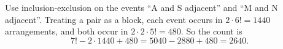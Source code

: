 Use inclusion-exclusion on the events ``A and S adjacent'' and ``M and N adjacent''. Treating a pair as a block, each event occurs in $2\cdot6!=1440$ arrangements, and both occur in $2\cdot2\cdot5!=480$. So the count is
\[7!-2\cdot1440+480=5040-2880+480=\boxed{2640}.\]
